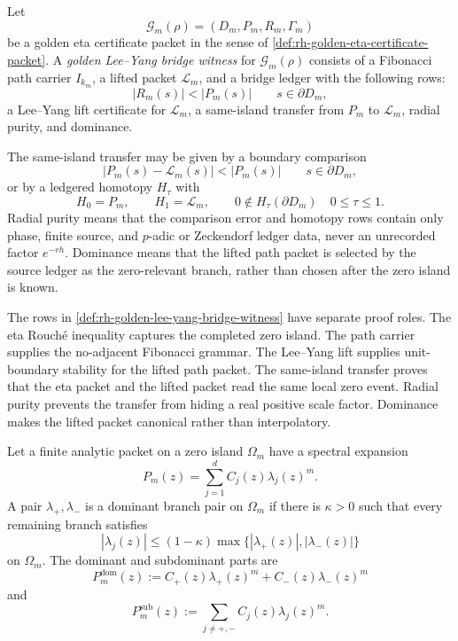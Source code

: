 \begin{definition}
\label{def:rh-golden-lee-yang-bridge-witness}
Let
$$
\mathcal G_m(\rho)=(D_m,P_m,R_m,\Gamma_m)
$$
be a golden eta certificate packet in the sense of
\autoref{def:rh-golden-eta-certificate-packet}.  A
\emph{golden Lee--Yang bridge witness} for $\mathcal G_m(\rho)$ consists
of a Fibonacci path carrier $I_{k_m}$, a lifted packet
$\mathcal L_m$, and a bridge ledger with the following rows:
$$
|R_m(s)|<|P_m(s)|
\qquad
s\in\partial D_m,
$$
a Lee--Yang lift certificate for $\mathcal L_m$, a same-island transfer
from $P_m$ to $\mathcal L_m$, radial purity, and dominance.

The same-island transfer may be given by a boundary comparison
$$
|P_m(s)-\mathcal L_m(s)|<|P_m(s)|
\qquad
s\in\partial D_m,
$$
or by a ledgered homotopy $H_{\tau}$ with
$$
H_0=P_m,
\qquad
H_1=\mathcal L_m,
\qquad
0\notin H_{\tau}(\partial D_m)
\quad
0\le\tau\le1.
$$
Radial purity means that the comparison error and homotopy rows contain
only phase, finite source, and $p$-adic or Zeckendorf ledger data, never
an unrecorded factor $e^{-r h}$.  Dominance means that the lifted path
packet is selected by the source ledger as the zero-relevant branch,
rather than chosen after the zero island is known.
\end{definition}

\begin{principle}
\label{prin:rh-golden-bridge-rows-independent}
The rows in \autoref{def:rh-golden-lee-yang-bridge-witness} have
separate proof roles.  The eta Rouch\'e inequality captures the
completed zero island.  The path carrier supplies the no-adjacent
Fibonacci grammar.  The Lee--Yang lift supplies unit-boundary stability
for the lifted path packet.  The same-island transfer proves that the
eta packet and the lifted packet read the same local zero event.  Radial
purity prevents the transfer from hiding a real positive scale factor.
Dominance makes the lifted packet canonical rather than interpolatory.
\end{principle}

\begin{definition}
\label{def:rh-golden-dominant-branch-packet}
Let a finite analytic packet on a zero island $\Omega_m$ have a spectral
expansion
$$
P_m(z)=\sum_{j=1}^{d}C_j(z)\lambda_j(z)^m.
$$
A pair $\lambda_+,\lambda_-$ is a dominant branch pair on $\Omega_m$ if
there is $\kappa>0$ such that every remaining branch satisfies
$$
|\lambda_j(z)|
\le
(1-\kappa)
\max\{|\lambda_+(z)|,|\lambda_-(z)|\}
$$
on $\Omega_m$.  The dominant and subdominant parts are
$$
P_m^{\mathrm{dom}}(z)
:=
C_+(z)\lambda_+(z)^m+C_-(z)\lambda_-(z)^m
$$
and
$$
P_m^{\mathrm{sub}}(z)
:=
\sum_{j\neq +,-}C_j(z)\lambda_j(z)^m.
$$
\end{definition}

